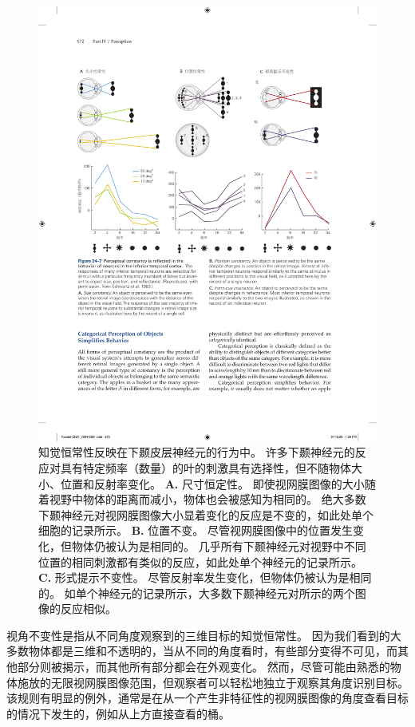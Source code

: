 \begin{figure}[htbp]
	\centering
	\includegraphics[width=1.0\linewidth]{chap24/fig_24_7}
	\caption{知觉恒常性反映在下颞皮层神经元的行为中。
		许多下颞神经元的反应对具有特定频率（数量）的叶的刺激具有选择性，但不随物体大小、位置和反射率变化。
		\textbf{A.} 尺寸恒定性。
		即使视网膜图像的大小随着视野中物体的距离而减小，物体也会被感知为相同的。
		绝大多数下颞神经元对视网膜图像大小显着变化的反应是不变的，如此处单个细胞的记录所示。
		\textbf{B.} 位置不变。
		尽管视网膜图像中的位置发生变化，但物体仍被认为是相同的。
		几乎所有下颞神经元对视野中不同位置的相同刺激都有类似的反应，如此处单个神经元的记录所示。
		\textbf{C.} 形式提示不变性。
		尽管反射率发生变化，但物体仍被认为是相同的。
		如单个神经元的记录所示，大多数下颞神经元对所示的两个图像的反应相似。}
	\label{fig:24_7}
\end{figure}


视角不变性是指从不同角度观察到的三维目标的知觉恒常性。
因为我们看到的大多数物体都是三维和不透明的，当从不同的角度看时，有些部分变得不可见，而其他部分则被揭示，而其他所有部分都会在外观变化。
然而，尽管可能由熟悉的物体施放的无限视网膜图像范围，但观察者可以轻松地独立于观察其角度识别目标。
该规则有明显的例外，通常是在从一个产生非特征性的视网膜图像的角度查看目标的情况下发生的，例如从上方直接查看的桶。


